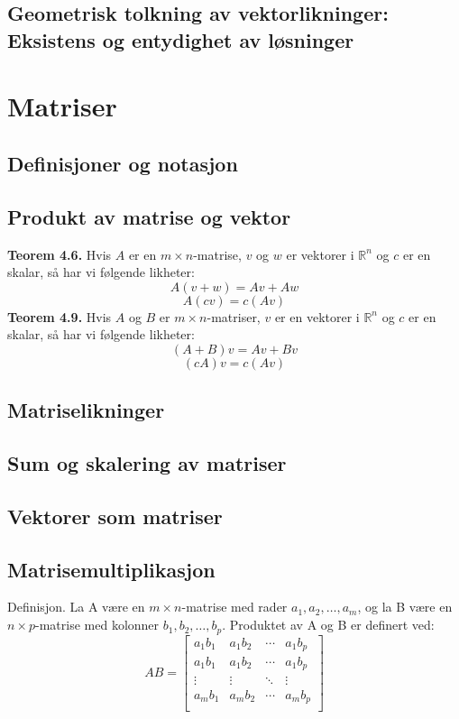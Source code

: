 \documentclass{article}
\begin{document}
\subsection{Geometrisk tolkning av vektorlikninger: Eksistens og entydighet av løsninger}




\clearpage
\section{Matriser}

\subsection{Definisjoner og notasjon}


\subsection{Produkt av matrise og vektor}
\textbf{Teorem 4.6.} Hvis $A$ er en $m \times n$-matrise, $v$ og $w$ er vektorer i $\mathbb{R}^n$ og $c$ er en skalar, så har vi følgende likheter:
\[ A(v + w) = Av + Aw \]
\[ A(cv) = c(Av) \]
\textbf{Teorem 4.9.} Hvis $A$ og $B$ er $m \times n$-matriser, $v$ er en vektorer i $\mathbb{R}^n$ og $c$ er en skalar, så har vi følgende likheter:
\[ (A + B)v = Av + Bv \]
\[ (cA)v = c(Av) \]


\subsection{Matriselikninger}


\subsection{Sum og skalering av matriser}


\subsection{Vektorer som matriser}


\subsection{Matrisemultiplikasjon}
Definisjon. La A være en $m \times n$-matrise med rader
$a_1, a_2, \dots, a_m$, og la B være en $n \times p$-matrise med
kolonner $b_1, b_2, \dots, b_p$. Produktet av A og B er definert ved:
\[ AB = \begin{bmatrix}
a_1b_1 & a_1b_2 & \cdots & a_1b_p \\
a_1b_1 & a_1b_2 & \cdots & a_1b_p \\
\vdots & \vdots & \ddots & \vdots \\
a_mb_1 & a_mb_2 & \cdots & a_mb_p \\
\end{bmatrix} \]
\end{document}
